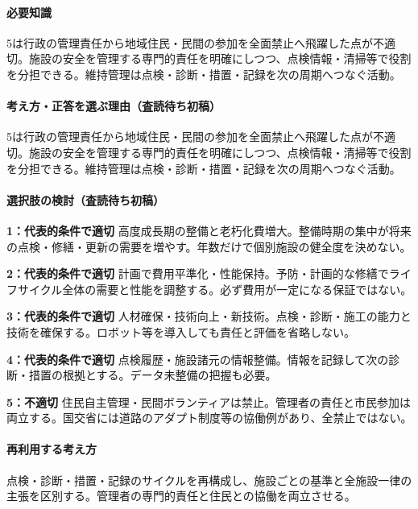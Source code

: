 \paragraph{必要知識} 5は行政の管理責任から地域住民・民間の参加を全面禁止へ飛躍した点が不適切。施設の安全を管理する専門的責任を明確にしつつ、点検情報・清掃等で役割を分担できる。維持管理は点検・診断・措置・記録を次の周期へつなぐ活動。

\paragraph{考え方・正答を選ぶ理由（査読待ち初稿）} 5は行政の管理責任から地域住民・民間の参加を全面禁止へ飛躍した点が不適切。施設の安全を管理する専門的責任を明確にしつつ、点検情報・清掃等で役割を分担できる。維持管理は点検・診断・措置・記録を次の周期へつなぐ活動。

\paragraph{選択肢の検討（査読待ち初稿）}\mbox{}\par

\noindent\textbf{1：代表的条件で適切} 高度成長期の整備と老朽化費増大。整備時期の集中が将来の点検・修繕・更新の需要を増やす。年数だけで個別施設の健全度を決めない。\par

\noindent\textbf{2：代表的条件で適切} 計画で費用平準化・性能保持。予防・計画的な修繕でライフサイクル全体の需要と性能を調整する。必ず費用が一定になる保証ではない。\par

\noindent\textbf{3：代表的条件で適切} 人材確保・技術向上・新技術。点検・診断・施工の能力と技術を確保する。ロボット等を導入しても責任と評価を省略しない。\par

\noindent\textbf{4：代表的条件で適切} 点検履歴・施設諸元の情報整備。情報を記録して次の診断・措置の根拠とする。データ未整備の把握も必要。\par

\noindent\textbf{5：不適切} 住民自主管理・民間ボランティアは禁止。管理者の責任と市民参加は両立する。国交省には道路のアダプト制度等の協働例があり、全禁止ではない。\par

\paragraph{再利用する考え方} 点検・診断・措置・記録のサイクルを再構成し、施設ごとの基準と全施設一律の主張を区別する。管理者の専門的責任と住民との協働を両立させる。

